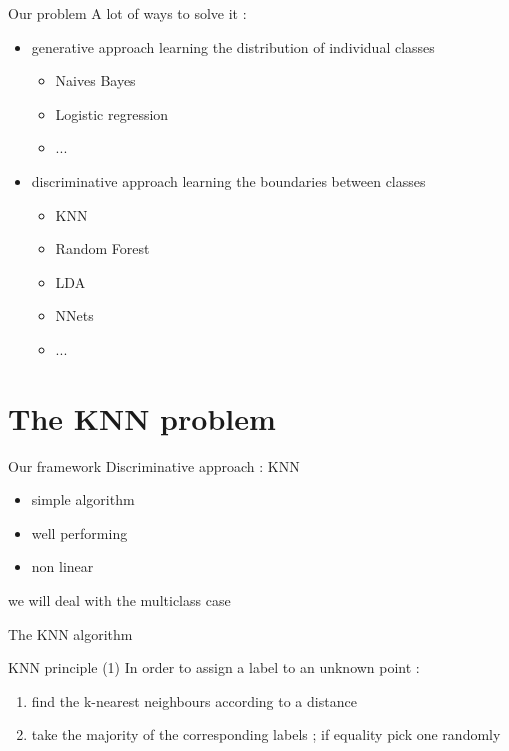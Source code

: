 \documentclass[11 pt]{beamer}
\begin{document}
\begin{frame}{Our problem}
A lot of ways to solve it :

\begin{itemize}
	\item generative approach
%
	\textrightarrow learning the distribution of individual classes

		\begin{itemize}
			\item Naives Bayes
			\item Logistic regression
			\item ...
		\end{itemize}
	\item discriminative approach
	\textrightarrow learning the boundaries between classes

		\begin{itemize}
			\item KNN
			\item Random Forest
			\item LDA
			\item NNets
			\item ...
		\end{itemize}
\end{itemize}
\end{frame}

\section{The KNN problem}


\begin{frame}{Our framework}
Discriminative approach : KNN
\begin{itemize}
	\item simple algorithm
	\item well performing
	\item non linear
\end{itemize}

\Large{\textrightarrow we will deal with the multiclass case}
\end{frame}


\begin{frame}{The KNN algorithm}
\begin{block}{KNN principle (1)}
In order to assign a label to an unknown point :
\begin{enumerate}
	\item find the k-nearest neighbours according to a distance
	\item take the majority of the corresponding labels ; if equality pick one randomly
\end{enumerate}
\end{block}
\end{frame}
\end{document}
